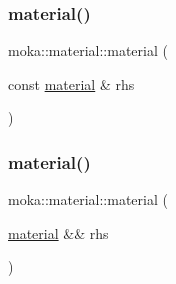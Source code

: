 \subsubsection{\texorpdfstring{material()}{material()}\hspace{0.1cm}{\footnotesize\ttfamily [2/5]}}
{\footnotesize\ttfamily moka\+::material\+::material (\begin{DoxyParamCaption}\item[{const \mbox{\hyperlink{classmoka_1_1material}{material}} \&}]{rhs }\end{DoxyParamCaption})}

\mbox{\label{classmoka_1_1material_a2d226f9f3b7736207af1f7035674b8ef}} 
\subsubsection{\texorpdfstring{material()}{material()}\hspace{0.1cm}{\footnotesize\ttfamily [3/5]}}
{\footnotesize\ttfamily moka\+::material\+::material (\begin{DoxyParamCaption}\item[{\mbox{\hyperlink{classmoka_1_1material}{material}} \&\&}]{rhs }\end{DoxyParamCaption})\hspace{0.3cm}{\ttfamily [noexcept]}}

\mbox{\label{classmoka_1_1material_a01b3dc796afae0e2446c99abeee6aba7}} 
